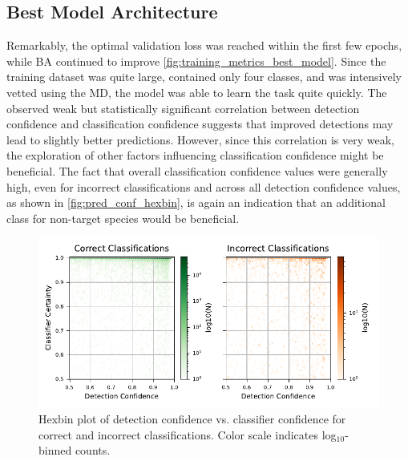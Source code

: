 \subsection{Best Model Architecture}
Remarkably, the optimal validation loss was reached within the first few epochs, while \ac{BA} continued to improve \autoref{fig:training_metrics_best_model}.
Since the training dataset was quite large, contained only four classes, and was intensively vetted using the \ac{MD}, the model was able to learn the task quite quickly.
The observed weak but statistically significant correlation between detection confidence and classification confidence suggests that improved detections may lead to slightly better predictions.
However, since this correlation is very weak, the exploration of other factors influencing classification confidence might be beneficial.
The fact that overall classification confidence values were generally high, even for incorrect classifications and across all detection confidence values, as shown in \autoref{fig:pred_conf_hexbin}, is again an indication that an additional class for non-target species would be beneficial.

\begin{figure}[ht]
\centering
\includegraphics{figures/pred_conf_hexbin.pdf}
\caption{Hexbin plot of detection confidence vs. classifier confidence for correct and incorrect classifications. Color scale indicates log$_{10}$-binned counts.}
\label{fig:pred_conf_hexbin}
\end{figure}

